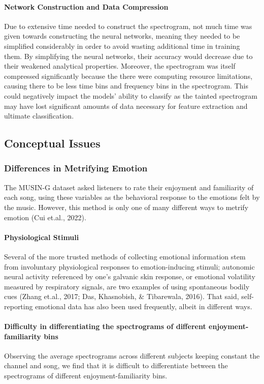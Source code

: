 \documentclass[fleqn,10pt]{SelfArx} %
\begin{document}
\paragraph{Network Construction and Data Compression}
Due to extensive time needed to construct the spectrogram, not much time was given towards constructing the neural networks, meaning they needed to be simplified considerably in order to avoid wasting additional time in training them. By simplifying the neural networks, their accuracy would decrease due to their weakened analytical properties. Moreover, the spectrogram was itself compressed significantly because the there were computing resource limitations, causing there to be less time bins and frequency bins in the spectrogram. This could negatively impact the models' ability to classify as the tainted spectrogram may have lost significant amounts of data necessary for feature extraction and ultimate classification.

\subsection{Conceptual Issues}


\subsubsection{Differences in Metrifying Emotion}

    The MUSIN-G dataset asked listeners to rate their enjoyment and familiarity of each song, using these variables as the behavioral response to the emotions felt by the music. However, this method is only one of many different ways to metrify emotion (Cui et.al., 2022). 
    
\paragraph{Physiological Stimuli}
Several of the more trusted methods of collecting emotional information stem from involuntary physiological responses to emotion-inducing stimuli; autonomic neural activity referenced by one's galvanic skin response, or emotional volatility measured by respiratory signals, are two examples of using spontaneous bodily cues (Zhang et.al., 2017; Das, Khasnobish, \& Tibarewala, 2016). That said, self-reporting emotional data has also been used frequently, albeit in different ways.

\paragraph{Difficulty in differentiating the spectrograms of different enjoyment-familiarity bins}
Observing the average spectrograms across different subjects keeping constant the channel and song, we find that it is difficult to differentiate between the spectrograms of different enjoyment-familiarity bins. 
\end{document}
